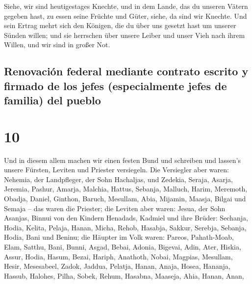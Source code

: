  Siehe, wir sind heutigestages Knechte, und in dem Lande,
das du unseren Vätern gegeben hast, zu essen seine Früchte und Güter,
siehe, da sind wir Knechte.  Und sein Ertrag mehrt sich
den Königen, die du über uns gesetzt hast um unserer Sünden willen; und
sie herrschen über unsere Leiber und unser Vieh nach ihrem Willen, und
wir sind in großer Not.

\hypertarget{renovaciuxf3n-federal-mediante-contrato-escrito-y-firmado-de-los-jefes-especialmente-jefes-de-familia-del-pueblo}{%
\subsection{Renovación federal mediante contrato escrito y firmado de
los jefes (especialmente jefes de familia) del
pueblo}\label{renovaciuxf3n-federal-mediante-contrato-escrito-y-firmado-de-los-jefes-especialmente-jefes-de-familia-del-pueblo}}

\hypertarget{section-9}{%
\section{10}\label{section-9}}

 Und in diesem allem machen wir einen festen Bund und
schreiben und lassen's unsere Fürsten, Leviten und Priester versiegeln.
 Die Versiegler aber waren: Nehemia, der Landpfleger, der
Sohn Hachaljas, und Zedekia,  Seraja, Asarja, Jeremia,
 Pashur, Amarja, Malchia,  Hattus, Sebanja,
Malluch,  Harim, Meremoth, Obadja,  Daniel,
Ginthon, Baruch,  Mesullam, Abia, Mijamin, 
Maasja, Bilgai und Semaja -- das waren die Priester;  die
Leviten aber waren: Jesua, der Sohn Asanjas, Binnui von den Kindern
Henadads, Kadmiel  und ihre Brüder: Sechanja, Hodia,
Kelita, Pelaja, Hanan,  Micha, Rehob, Hasabja,
 Sakkur, Serebja, Sebanja,  Hodia, Bani
und Beninu;  die Häupter im Volk waren: Pareos,
Pahath-Moab, Elam, Satthu, Bani,  Bunni, Asgad, Bebai,
 Adonia, Bigevai, Adin,  Ater, Hiskia,
Assur,  Hodia, Hasum, Bezai,  Hariph,
Anathoth, Nobai,  Magpias, Mesullam, Hesir,
 Mesesabeel, Zadok, Jaddua,  Pelatja,
Hanan, Anaja,  Hosea, Hananja, Hassub, 
Halohes, Pilha, Sobek,  Rehum, Hasabna, Maaseja,
 Ahia, Hanan, Anan,

